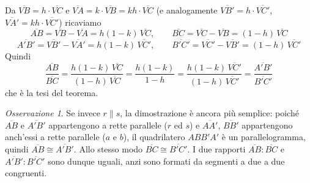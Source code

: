 \documentclass[a4paper,12pt]{article}
\theoremstyle{definition}
\theoremstyle{remark}
\newtheorem{oss}{Osservazione}[section]
\begin{document}
Da $\overline{VB}=h\cdot\overline{VC}$ e $\overline{VA}=k\cdot\overline{VB}=kh\cdot\overline{VC}$ (e analogamente $\overline{VB'}=h\cdot\overline{VC'}$, $\overline{VA'}=kh\cdot\overline{VC'}$) ricaviamo
$$\overline{AB}=\overline{VB}-\overline{VA}=h(1-k)\,\overline{VC}, \qquad \overline{BC}=\overline{VC}-\overline{VB}=(1-h)\,\overline{VC}$$
$$\overline{A'B'}=\overline{VB'}-\overline{VA'}=h(1-k)\,\overline{VC'}, \qquad \overline{B'C'}=\overline{VC'}-\overline{VB'}=(1-h)\,\overline{VC'}$$
Quindi
$$\frac{\overline{AB}}{\overline{BC}} = \frac{h(1-k)\,\overline{VC}}{(1-h)\,\overline{VC}} = \frac{h(1-k)}{1-h} = \frac{h(1-k)\,\overline{VC'}}{(1-h)\,\overline{VC'}} = \frac{\overline{A'B'}}{\overline{B'C'}}$$
che è la tesi del teorema.

\begin{oss}
Se invece $r \parallel s$, la dimostrazione è ancora più semplice: poiché $\overline{AB}$ e $\overline{A'B'}$ appartengono a rette parallele ($r$ ed $s$) e $\overline{AA'}$, $\overline{BB'}$ appartengono anch'essi a rette parallele ($a$ e $b$), il quadrilatero $ABB'A'$ è un parallelogramma, quindi $\overline{AB}\cong\overline{A'B'}$. Allo stesso modo $\overline{BC}\cong\overline{B'C'}$. I due rapporti $\overline{AB}:\overline{BC}$ e $\overline{A'B'}:\overline{B'C'}$ sono dunque uguali, anzi sono formati da segmenti a due a due congruenti.
\end{oss}
\end{document}
